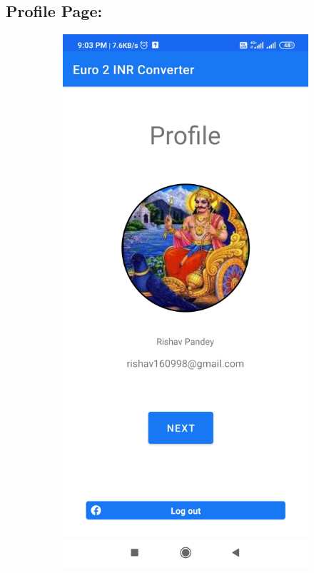 \documentclass[12pt]{article}
\begin{document}
\subsection{Profile Page:}

\begin{figure}[h]
\centering
\begin{subfigure}[h]{0.3\textwidth}
\centering
\includegraphics[scale=0.065]{146977758-1400c343-92b2-4aa8-b816-308310efb1fa.jpg}

\end{subfigure}
\end{figure}
\end{document}
